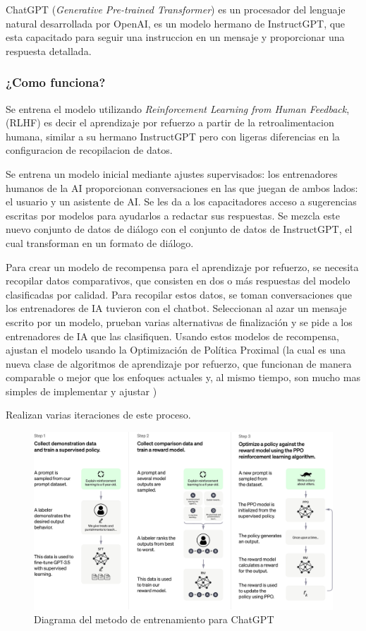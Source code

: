 \documentclass[runningheads]{llncs} %
\begin{document}
ChatGPT (\textit{Generative Pre-trained Transformer}) es un procesador del lenguaje natural
desarrollada por OpenAI, es un modelo hermano de InstructGPT, que esta capacitado
para seguir una instruccion en un mensaje y proporcionar una respuesta detallada.
\cite{ej-chatgpt}
\subsubsection{¿Como funciona?}
Se entrena el modelo utilizando \textit{Reinforcement Learning from Human Feedback}, 
(RLHF) es decir el aprendizaje por refuerzo a partir de la retroalimentacion humana,
similar a su hermano InstructGPT pero con ligeras diferencias en la configuracion de
recopilacion de datos. \cite{ej-chatgpt}

Se entrena un modelo inicial mediante ajustes supervisados: los entrenadores humanos
de la AI proporcionan conversaciones en las que juegan de ambos lados: el usuario
y un asistente de AI. Se les da a los capacitadores acceso a sugerencias escritas
por modelos para ayudarlos a redactar sus respuestas. 
Se mezcla este nuevo conjunto de datos de diálogo con el conjunto de datos de InstructGPT, 
el cual transforman en un formato de diálogo. \cite{ej-chatgpt}

Para crear un modelo de recompensa para el aprendizaje por refuerzo, 
se necesita recopilar datos comparativos, que consisten en dos o más respuestas 
del modelo clasificadas por calidad. Para recopilar estos datos, se toman conversaciones 
que los entrenadores de IA tuvieron con el chatbot. Seleccionan al azar un mensaje 
escrito por un modelo, prueban varias alternativas de finalización y se pide a los 
entrenadores de IA que las clasifiquen. Usando estos modelos de recompensa, 
ajustan el modelo usando la Optimización de Política Proximal (la cual es
una nueva clase de algoritmos de aprendizaje por refuerzo, que funcionan de manera
comparable o mejor que los enfoques actuales y, al mismo tiempo, son mucho mas
simples de implementar y ajustar \cite{def-PPO})

Realizan varias iteraciones de este proceso. \cite{ej-chatgpt}

\begin{figure}
    \centering
    \includegraphics[scale=0.4]{ChatGPT_Diagram.jpg}
    \caption{Diagrama del metodo de entrenamiento
    para ChatGPT \cite{ej-chatgpt}}
    \label{fig:chatgpt-diagrama}
\end{figure}
\end{document}
